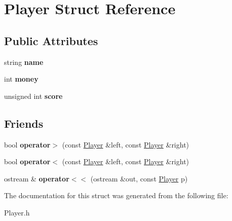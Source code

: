 \hypertarget{struct_player}{}\section{Player Struct Reference}
\label{struct_player}
\subsection*{Public Attributes}
\begin{DoxyCompactItemize}
\item 
\hypertarget{struct_player_acf0355128a99ee20ad9931b760fb2de1}{}\label{struct_player_acf0355128a99ee20ad9931b760fb2de1} 
string {\bfseries name}
\item 
\hypertarget{struct_player_a9545beef70350d5c3b3a5719a890dd2f}{}\label{struct_player_a9545beef70350d5c3b3a5719a890dd2f} 
int {\bfseries money}
\item 
\hypertarget{struct_player_a38a6dafe988a768a435cc0a9fde38e46}{}\label{struct_player_a38a6dafe988a768a435cc0a9fde38e46} 
unsigned int {\bfseries score}
\end{DoxyCompactItemize}
\subsection*{Friends}
\begin{DoxyCompactItemize}
\item 
\hypertarget{struct_player_aa803c4fa6e9643d45bbfbbe31e0840f4}{}\label{struct_player_aa803c4fa6e9643d45bbfbbe31e0840f4} 
bool {\bfseries operator$>$} (const \hyperlink{struct_player}{Player} \&left, const \hyperlink{struct_player}{Player} \&right)
\item 
\hypertarget{struct_player_a33e26ad801836e16a861e3a4b29caabb}{}\label{struct_player_a33e26ad801836e16a861e3a4b29caabb} 
bool {\bfseries operator$<$} (const \hyperlink{struct_player}{Player} \&left, const \hyperlink{struct_player}{Player} \&right)
\item 
\hypertarget{struct_player_a247ab62711ed1d5796e214a6a472d8e7}{}\label{struct_player_a247ab62711ed1d5796e214a6a472d8e7} 
ostream \& {\bfseries operator$<$$<$} (ostream \&out, const \hyperlink{struct_player}{Player} p)
\end{DoxyCompactItemize}


The documentation for this struct was generated from the following file\+:\begin{DoxyCompactItemize}
\item 
Player.\+h\end{DoxyCompactItemize}
